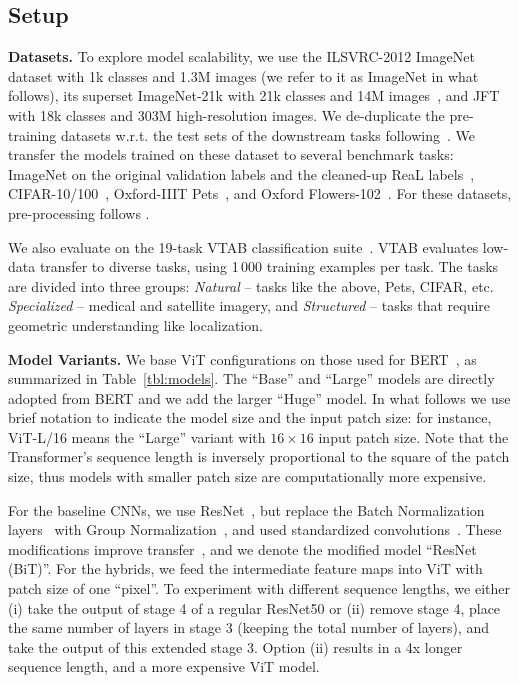\subsection{Setup}

\textbf{Datasets.}
To explore model scalability, we use the ILSVRC-2012 ImageNet dataset with 1k classes and 1.3M images (we refer to it as ImageNet in what follows), its superset ImageNet-21k with 21k classes and 14M images~\citep{deng2009-imagenet}, and JFT~\citep{sun2017-jft} with  18k classes and 303M high-resolution images. We de-duplicate the pre-training datasets w.r.t. the test sets of the downstream tasks following~\citet{kolesnikov2020-bit}.
We transfer the models trained on these dataset to several benchmark tasks: ImageNet on the original validation labels and the cleaned-up ReaL labels~\citep{beyer2020-imagenet}, CIFAR-10/100~\citep{Krizhevsky2009-cifar}, Oxford-IIIT Pets~\citep{parkhi2012-pets}, and  Oxford Flowers-102~\citep{Nilsback2008-flowers}. For these datasets, pre-processing follows \citet{kolesnikov2020-bit}.

We also evaluate on the 19-task VTAB classification suite~\citep{vtab}. VTAB evaluates low-data transfer to diverse tasks, using 1\,000 training examples per task. The tasks are divided into three groups: 
\textit{Natural} -- tasks like the above, Pets, CIFAR, etc.
\textit{Specialized} -- medical and satellite imagery, and
\textit{Structured} -- tasks that require geometric understanding like localization.

\textbf{Model Variants.} We base ViT configurations on those used for BERT~\citep{devlin19-bert}, as summarized in Table~\ref{tbl:models}. 
The ``Base'' and ``Large'' models are directly adopted from BERT and we add the larger ``Huge'' model. In what follows we use brief notation to indicate the model size and the input patch size: for instance, ViT-L/16 means the ``Large'' variant with $16\times 16$ input patch size. Note that the Transformer's sequence length is inversely proportional to the square of the patch size, thus models with smaller patch size are computationally more expensive.

For the baseline CNNs, we use ResNet~\citep{he2016deep}, but replace the Batch Normalization layers~\citep{ioffe2015batch} with Group Normalization~\citep{wu2018group}, and used standardized convolutions~\citep{qiao2019ws}. These modifications improve transfer~\citep{kolesnikov2020-bit}, and we denote the modified model ``ResNet (BiT)''. For the hybrids, we feed the intermediate feature maps into ViT with patch size of one ``pixel''. To experiment with different sequence lengths, we either (i) take the output of stage 4 of a regular ResNet50 or (ii) remove stage 4, place the same number of layers in stage 3 (keeping the total number of layers), and take the output of this extended stage 3. Option (ii) results in a 4x longer sequence length, and a more expensive ViT model.

